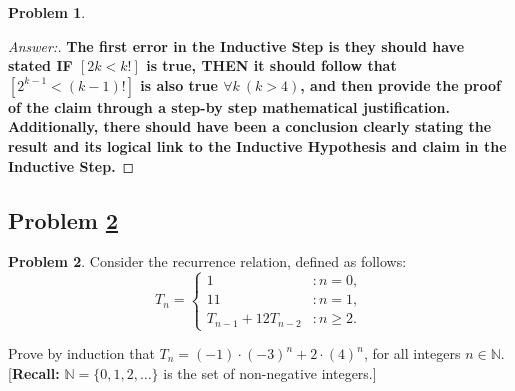 \documentclass[11pt]{article}
\theoremstyle{definition}
\theoremstyle{definition}
\newtheorem{required}{Problem}
\theoremstyle{definition}
\begin{document}
\begin{required}
\begin{enumerate}[label=(\alph*)]
\begin{proof}[Answer:]
\item \textbf{The first error in the Inductive Step is they should have stated IF  $[2k < k!]$ is true, THEN it should follow that 
$[2^{k-1} < (k - 1)!]$ is also true $\forall k\ (k > 4)$, and then provide the proof of the claim through a step-by step mathematical justification. Additionally, there should have been a conclusion clearly stating the result and its logical link to the Inductive Hypothesis and claim in the Inductive Step.}
\end{proof}
\end{enumerate}
\end{required}





\newpage
\subsection{Problem \ref{Induction2}} 
\begin{required} \label{Induction2}
Consider the recurrence relation, defined as follows:
\[
T_{n} = \begin{cases} 1 & : n = 0, \\
11 & : n = 1, \\
T_{n-1} + 12T_{n-2} & : n \geq 2.
\end{cases}
\]

\noindent Prove by induction that $T_{n} = (-1) \cdot (-3)^{n} + 2 \cdot (4)^{n}$, for all integers $n \in \mathbb{N}$. [\textbf{Recall:} $\mathbb{N} = \{0, 1, 2, \ldots \}$ is the set of non-negative integers.]
\end{required}
\end{document}
